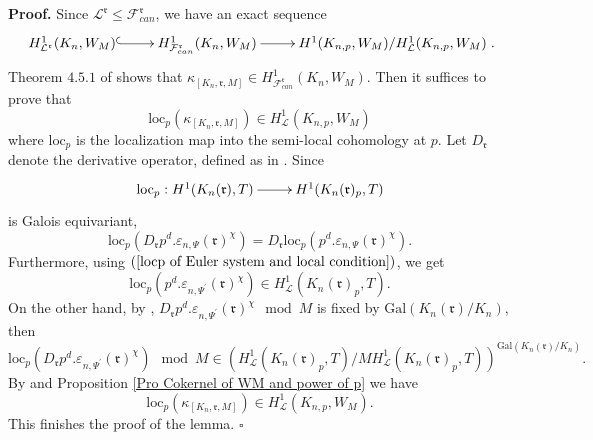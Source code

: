\documentclass[reqno]{amsart}
\begin{document}
\noindent \textbf{Proof.} Since $\mathcal{L}^{\mathfrak{r}}\leq
\mathcal{F}_{can}^{\mathfrak{r}}$, we have an exact sequence
$$
\xymatrix@=2pc{
H^{1}_{\mathcal{L}^{\mathfrak{r}}}(K_{n},W_{M})\ar@{^{(}->}[r]&
H^{1}_{\mathcal{F}_{can}^{\mathfrak{r}}}(K_{n},W_{M})\ar[r]&
H^{1}(K_{n,p},W_{M})/H^{1}_{\mathcal{L}}(K_{n,p},W_{M})}.
$$
Theorem $4.5.1$ of \cite{Rubin00} shows that
$\kappa_{[K_{n},\mathfrak{r},M]}\in
H^{1}_{\mathcal{F}_{can}^{\mathfrak{r}}}(K_{n},W_{M})$. Then it
suffices to prove that
$$
\mathrm{loc}_{p}(\kappa_{[K_{n},\mathfrak{r},M]})\in
H^{1}_{\mathcal{L}}(K_{n,p},W_{M})
$$
 where $\mathrm{loc}_{p}$ is the localization map into
the semi-local cohomology at $p$. Let $D_{\mathfrak{r}}$ denote the
derivative operator, defined as in \cite[Definition
\textrm{IV}.4.1]{Rubin00}. Since
 $$
 \xymatrix@=2pc{\mathrm{loc}_{p}:
 H^{1}(K_{n}(\mathfrak{r}),T)\ar[r]&
 H^{1}(K_{n}(\mathfrak{r})_{p},T)}
 $$
is Galois equivariant,
$$
\mathrm{loc}_{p}(D_{\mathfrak{r}}p^{d}.\varepsilon_{n,\Psi}(\mathfrak{r})^{\chi})=
D_{\mathfrak{r}}\mathrm{loc}_{p}(p^{d}.\varepsilon_{n,\Psi}(\mathfrak{r})^{\chi}).
$$
Furthermore, using $(\ref{locp of Euler system and local
condition})$, we get
$$\mathrm{loc}_{p}(p^{d}.\varepsilon_{n,\Psi^{\prime}}(\mathfrak{r})^{\chi})\in
H^{1}_{\mathcal{L}}(K_{n}(\mathfrak{r})_{p},T).$$ On the other hand,
by \cite[Lemma 4.4.2]{Rubin00},
$D_{\mathfrak{r}}p^{d}.\varepsilon_{n,\Psi^{\prime}}(\mathfrak{r})^{\chi}\mod
M$ is fixed by $\mathrm{Gal}(K_{n}(\mathfrak{r})/K_{n})$, then
$$
\mathrm{loc}_{p}(D_{\mathfrak{r}}p^{d}.\varepsilon_{n,\Psi^{\prime}}(\mathfrak{r})^{\chi})\mod
M\in (H^{1}_{\mathcal{L}}(K_{n}(\mathfrak{r})_{p},T)/
MH^{1}_{\mathcal{L}}(K_{n}(\mathfrak{r})_{p},T))^{\mathrm{Gal}(K_{n}(\mathfrak{r})/K_{n})}.
$$
By \cite[Lemma 4.4.13]{Rubin00} and Proposition \ref{Pro Cokernel of
WM and power of p} we have
$$
\mathrm{loc}_{p}(\kappa_{[K_{n},\mathfrak{r},M]})\in
H^{1}_{\mathcal{L}}(K_{n,p},W_{M}).
$$
This finishes the proof of the lemma. \hfill $\square$
\end{document}

